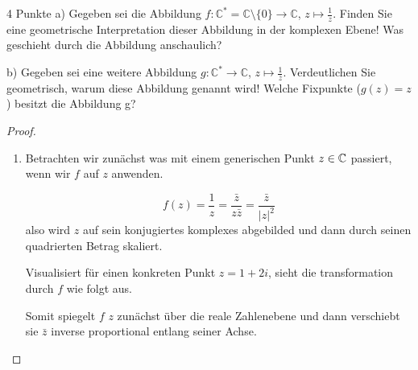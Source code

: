 \documentclass{../problemset}
\begin{document}
\begin{problem}[Einheitskreis]{4 Punkte}
a) Gegeben sei die Abbildung $f : \mathbb{C}^* = \mathbb{C} \setminus \{0\} \rightarrow \mathbb{C}$, $z \mapsto \frac{1}{z}$. Finden Sie eine geometrische Interpretation dieser Abbildung in der komplexen Ebene! Was geschieht durch die Abbildung anschaulich?

b) Gegeben sei eine weitere Abbildung $g : \mathbb{C}^* \rightarrow
	\mathbb{C}$, $z \mapsto \frac{1}{\overline{z}}$. Verdeutlichen Sie geometrisch,
warum diese Abbildung  genannt
wird! Welche Fixpunkte ($g(z) = z$) besitzt die Abbildung g?

\begin{proof}
	\leavevmode
	\begin{enumerate}
		\item Betrachten wir zunächst was mit einem generischen Punkt $z \in \mathbb{C}$
		      passiert, wenn wir $f$ auf $z$ anwenden.

		      \[
			      f(z) = \frac{1}{z} = \frac{\bar{z}}{z \bar{z}} = \frac{\bar{z}}{{|z|}^2}
		      \] also wird $z$ auf sein konjugiertes komplexes abgebilded und dann durch seinen
		      quadrierten Betrag skaliert.

		      Visualisiert für einen konkreten Punkt $z = 1 + 2i$, sieht die transformation
		      durch $f$ wie folgt aus.

		      \begin{center}
		      \end{center}

		      Somit spiegelt $f$ $z$ zunächst über die reale Zahlenebene und dann verschiebt
		      sie $\bar{z}$ inverse proportional entlang seiner Achse.


\end{enumerate}
\end{proof}
\end{problem}
\end{document}
